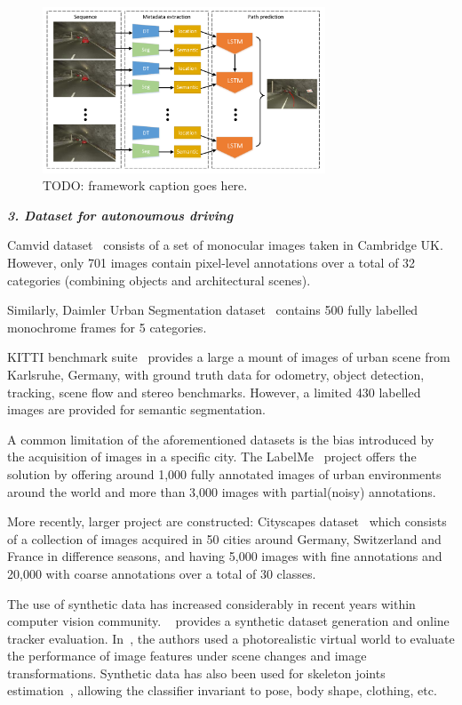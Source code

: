 \documentclass[10pt,twocolumn,letterpaper]{article}
\begin{document}
\begin{figure}[t]
        \centering
        \includegraphics[width=0.75\textwidth]{figures/framework.pdf}
        \caption{ {\small TODO: framework caption goes here.}}
        \label{fig:framework}
\end{figure}

\textbf{\emph{3. Dataset for autonoumous driving}}

Camvid dataset~\cite{Camvid} consists of a set of monocular images taken in Cambridge UK. However, only 701 images contain pixel-level annotations over a total of 32 categories (combining objects and architectural scenes).

Similarly, Daimler Urban Segmentation dataset~\cite{scharwachter2013efficient} contains 500 fully labelled monochrome frames for 5 categories.

KITTI benchmark suite~\cite{Geiger2013IJRR} provides a large a mount of images of urban scene from Karlsruhe, Germany, with ground truth data for odometry, object detection, tracking, scene flow and stereo benchmarks. However, a limited 430 labelled images are provided for semantic segmentation.

A common limitation of the aforementioned datasets is the bias introduced by the acquisition of images in a specific city. The LabelMe~\cite{russell2008labelme} project offers the solution by offering around 1,000 fully annotated images of urban environments around the world and more than 3,000 images with partial(noisy) annotations.

More recently, larger project are constructed:
Cityscapes dataset~\cite{Cordts2016Cityscapes} which consists of a collection of images acquired in 50 cities around Germany, Switzerland and France in difference seasons, and having 5,000 images with fine annotations and 20,000 with coarse annotations over a total of 30 classes.

The use of synthetic data has increased considerably in recent years within computer vision community. ~\cite{mueller2016benchmark} provides a synthetic dataset generation and online tracker evaluation. In~\cite{kaneva2011evaluation}, the authors used a photorealistic virtual world to evaluate the performance of image features under scene changes and image transformations. Synthetic data has also been used for skeleton joints estimation~\cite{shotton2013real}, allowing the classifier invariant to pose, body shape, clothing, etc.
\end{document}

